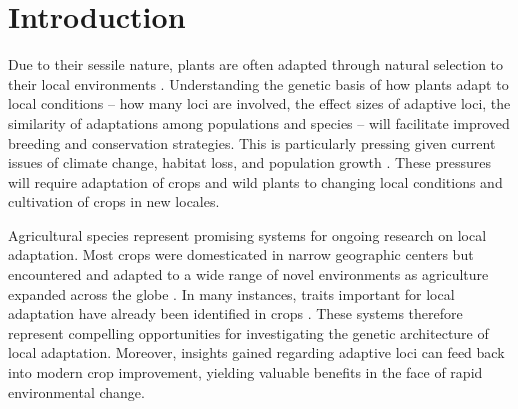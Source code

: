 
\begin{center}
\end{center}
%
%

\section*{Introduction}

Due to their sessile nature, plants are often adapted through natural selection to their local environments \citep{stebbins1950variation}. Understanding the genetic basis of how plants adapt to local conditions -- how many loci are involved, the effect sizes of adaptive loci, the similarity of adaptations among populations and species -- will facilitate improved breeding and conservation strategies.  This is particularly pressing given current issues of climate change, habitat loss, and population growth \citep{savolainen2013ecological}.  These pressures will require adaptation of crops and wild plants to changing local conditions and cultivation of crops in new locales.   

Agricultural species represent promising systems for ongoing research on local adaptation.  Most crops were domesticated in narrow geographic centers but encountered and adapted to a wide range of novel environments as agriculture expanded across the globe \citep{Gepts201451}.  In many instances,  traits important for  local adaptation have already been identified in crops \citep{Gepts201451, purugganan2009nature}.  These systems therefore represent compelling opportunities for investigating the genetic architecture of local adaptation.  Moreover, insights gained regarding adaptive loci can feed back into modern crop improvement, yielding valuable benefits in the face of rapid environmental change.

